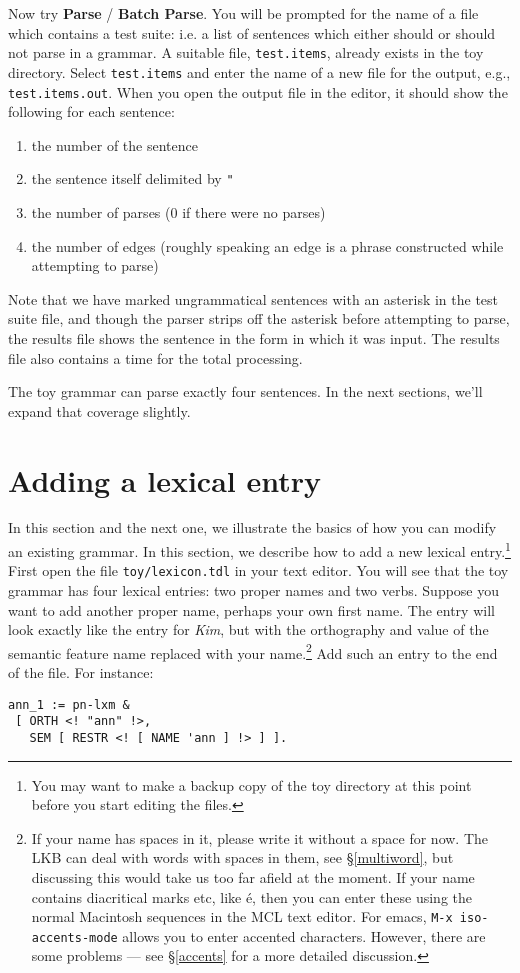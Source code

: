 \documentclass[12pt]{report}
\newcommand{\filename}[1]{{\tt #1}}
\newcommand{\lkbmenucommand}{\bf}
\begin{document}
Now try {\lkbmenucommand Parse} / {\lkbmenucommand Batch Parse}.  
You will be prompted for the
name of a file which contains a test suite: i.e. a list of sentences
which either should or should not parse in a grammar.  A suitable file,
\filename{test.items}, already exists in the toy directory.  Select 
\filename{test.items} and enter the name of a new file for the output,
e.g., \filename{test.items.out}.  When you open the output file in
the editor, it should show the following for each sentence:
\begin{enumerate}
\item the number of the sentence
\item the sentence itself delimited by {\tt "}
\item the number of parses (0 if there were no parses)
\item the number of edges (roughly speaking an edge is a
phrase constructed while attempting to parse) 
\end{enumerate}
Note that we have marked ungrammatical sentences with an asterisk
in the test suite file, and though the parser strips off the asterisk before 
attempting to parse, the results file shows the sentence in the
form in which it was input. 
The results file also contains a time for the total processing.

The toy grammar can parse exactly four 
sentences.  In the next sections, we'll expand that coverage slightly.


\section{Adding a lexical entry}

In this section and the next one, we illustrate the basics of how you can
modify an existing grammar.
In this section, we describe how to add a new lexical entry.\footnote{You 
may want to make a backup copy of the toy
directory at this point before you start editing the files.}
First open the file \filename{toy/lexicon.tdl} in your text 
editor.
You will see that
the toy grammar has four lexical entries: two proper names and two verbs.
Suppose you want to add another proper name,
perhaps your own first name.  The entry will look exactly like
the entry for {\it Kim}, but with the orthography and value
of the semantic feature {\feature name} replaced with your name.\footnote{If your name
has spaces in it, please write it without a space for now.  
The LKB can deal with words with spaces in them, see \S\ref{multiword},
but discussing this would take us too far afield at the moment.  If your name contains
diacritical marks etc, like \'{e}, then you can enter these 
using the normal Macintosh sequences 
in the MCL text editor.  For emacs, {\tt M-x iso-accents-mode} allows
you to enter accented characters.  
However, there are some problems --- see \S\ref{accents} for a more
detailed discussion.}
Add such an entry to the end of the file.
For instance:
\begin{verbatim}
ann_1 := pn-lxm & 
 [ ORTH <! "ann" !>,
   SEM [ RESTR <! [ NAME 'ann ] !> ] ].
\end{verbatim}
\end{document}

